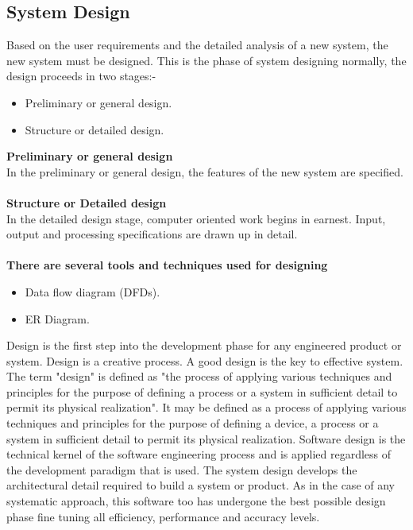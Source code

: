 \subsection{System Design}
Based on the user requirements and the detailed analysis of a new system, the new system must be designed. This is the phase of system designing normally, the design proceeds
in two stages:-\\
\begin{itemize}
\item Preliminary or general design.
\item Structure or detailed design.
\end{itemize}
{\bf Preliminary or general design}\\
In the preliminary or general design, the features of the new system are specified.\\\\
{\bf Structure or Detailed design}\\
In the detailed design stage, computer oriented work begins in earnest. Input, output and processing specifications are drawn up in detail.\\\\
{\bf There are several tools and techniques used for designing}\\
\begin{itemize}
\item Data flow diagram (DFDs).
\item ER Diagram.
\end{itemize}
Design is the first step into the development phase for any engineered product or system. Design is a creative process. A good design is the key to effective system. The term
"design" is defined as "the process of applying various techniques and principles for the purpose of defining a process or a system in sufficient detail to permit its physical realization". It may be defined as a process of applying various techniques and principles for the purpose of defining a device, a process or a system in sufficient detail to permit its physical realization. Software design is the technical kernel of the software engineering
process and is applied regardless of the development paradigm that is used. The system design develops the architectural detail required to build a system or product. As in the case of any systematic approach, this software too has undergone the best possible design phase fine tuning all efficiency, performance and accuracy levels.
